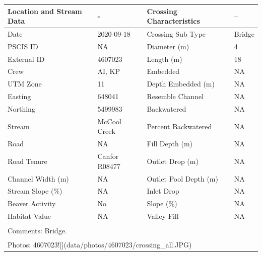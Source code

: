 \documentclass[
]{book}
\begin{document}
\begin{tabular}{llll}
\toprule
Location and Stream Data & - & Crossing Characteristics & --\\
\midrule
Date & 2020-09-18 & Crossing Sub Type & Bridge\\
PSCIS ID & NA & Diameter (m) & 4\\
External ID & 4607023 & Length (m) & 18\\
Crew & AI, KP & Embedded & NA\\
UTM Zone & 11 & Depth Embedded (m) & NA\\
\addlinespace
Easting & 648041 & Resemble Channel & NA\\
Northing & 5499983 & Backwatered & NA\\
Stream & McCool Creek & Percent Backwatered & NA\\
Road & NA & Fill Depth (m) & NA\\
Road Tenure & Canfor R08477 & Outlet Drop (m) & NA\\
\addlinespace
Channel Width (m) & NA & Outlet Pool Depth (m) & NA\\
Stream Slope (\%) & NA & Inlet Drop & NA\\
Beaver Activity & No & Slope (\%) & NA\\
Habitat Value & NA & Valley Fill & NA\\
\bottomrule
\multicolumn{4}{l}{\textsuperscript{} Comments: Bridge.}\\
\multicolumn{4}{l}{\textsuperscript{} Photos: 4607023![](data/photos/4607023/crossing\_all.JPG)}\\
\end{tabular}
\end{document}
